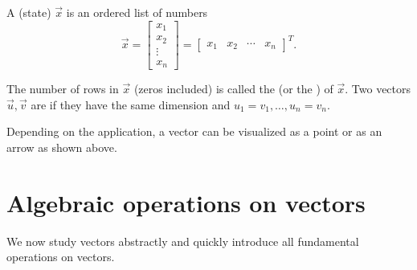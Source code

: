 \documentclass[../main.tex]{subfiles}
\begin{document}
\begin{definition}[vectors] \label{def:vectors}
  A (state)  \(\vec{x}\) is an ordered list of numbers
  \[
    \vec{x} = 
    \begin{bmatrix}
      x_{1} \\ x_{2} \\ \vdots \\ x_{n}
    \end{bmatrix}
    = 
    \begin{bmatrix}
      x_{1} & x_{2} & \cdots & x_{n}
    \end{bmatrix}^{T}.
  \]

  The number of rows in \(\vec{x}\) (zeros included) is called the  (or the ) of \(\vec{x}\).  Two vectors \(\vec{u}, \vec{v}\) are  if they have the same dimension and \(u_{1} = v_{1}, \ldots, u_{n} = v_{n}\). 
\end{definition}
Depending on the application, a vector can be visualized as a point or as an arrow as shown above.

\clearpage

\section{Algebraic operations on vectors}

We now study vectors abstractly and quickly introduce all fundamental operations on vectors. \medskip
\end{document}
